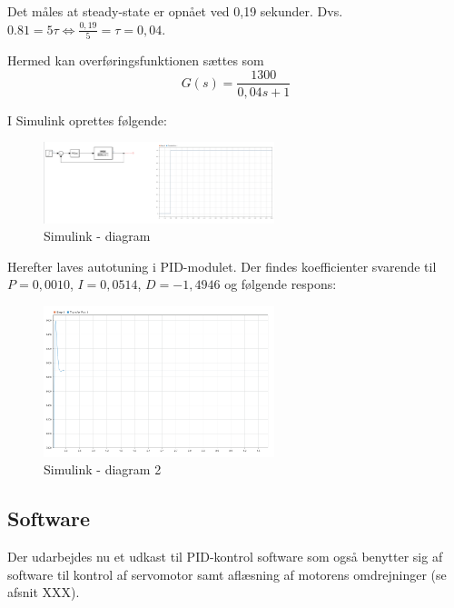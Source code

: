 Det måles at steady-state er opnået ved 0,19 sekunder. Dvs. $0.81 = 5\tau \Leftrightarrow \frac{0,19}{5}=\tau=0,04$.

Hermed kan overføringsfunktionen sættes som
\begin{equation}
  \label{eq:1}
G(s) = \frac{1300}{0,04s+1}  
\end{equation}

\clearpage
I Simulink oprettes følgende:

\begin{figure}[h]
  \centering
  \includegraphics[width=0.6\textwidth]{sbil1.png}
  \caption{Simulink - diagram}
  \label{fig:sbil1}
\end{figure}

Herefter laves autotuning i PID-modulet. Der findes koefficienter svarende til $P=0,0010$, $I=0,0514$, $D=-1,4946$ og følgende respons:

\begin{figure}[h]
  \centering
  \includegraphics[width=0.6\textwidth]{sbil2.png}
  \caption{Simulink - diagram 2}
  \label{fig:sbil1}
\end{figure}

\subsection{Software}
\label{sec:software-1}

Der udarbejdes nu et udkast til PID-kontrol software som også benytter sig af software til kontrol af servomotor samt aflæsning af motorens omdrejninger (se afsnit XXX).

